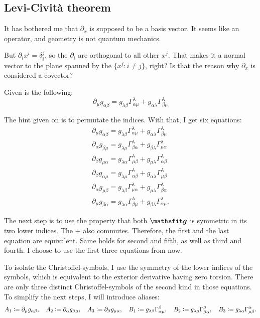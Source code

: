 \subsection{Levi-Cività theorem}

\begin{aside}
    It has bothered me that $\partial_x$ is supposed to be a basis vector. It
    seems like an operator, and geometry is not quantum mechanics.

    But $\partial_i x^i = \delta^j_i$, so the $\partial_i$ are orthogonal to
    all other $x^j$. That makes it a normal vector to the plane spanned by the
    $\{ x^j \colon i \neq j \}$, right? Is that the reason why $\partial_x$ is
    considered a covector?
\end{aside}

\newcommand\equ[3]{\partial_{#1} g_{{#2}{#3}} = g_{\lambda{#3}} \Gamma^\lambda_{{#2}{#1}} + g_{{#2}\lambda} \Gamma^\lambda_{{#3}{#1}}}

Given is the following:
\[
    \equ\mu\alpha\beta
\]

The hint given on \parencite{wikipedia/Fundamental_Riemannian} is to permutate
the indices. With that, I get six equations:
\begin{gather*}
    \equ\mu\alpha\beta \\
    \equ\alpha\beta\mu \\
    \equ\beta\mu\alpha \\
    \equ\beta\alpha\mu \\
    \equ\alpha\mu\beta \\
    \equ\mu\beta\alpha.
\end{gather*}

The next step is to use the property that both $\tens g$ is symmetric in its
two lower indices. The $+$ also commutes. Therefore, the first and the last
equation are equivalent. Same holds for second and fifth, as well as third and
fourth. I choose to use the first three equations from now.

To isolate the Christoffel-symbols, I use the symmetry of the lower indices of
the symbols, which is equivalent to the exterior derivative having zero
torsion. There are only three distinct Christoffel-symbols of the second kind
in those equations. To simplify the next steps, I will introduce aliases:
\[
    A_1 := \partial_\mu g_{\alpha\beta}
    ,\quad
    A_2 := \partial_\alpha g_{\beta\mu}
    ,\quad
    A_3 := \partial_\beta g_{\mu\alpha}
    ,\quad
    B_1 := g_{\lambda\beta} \Gamma^{\beta}_{{\alpha}{\mu}}
    ,\quad
    B_2 := g_{\lambda\mu} \Gamma^{\mu}_{{\beta}{\alpha}}
    ,\quad
    B_3 := g_{\lambda\alpha} \Gamma^{\alpha}_{{\mu}{\beta}}.
\]

